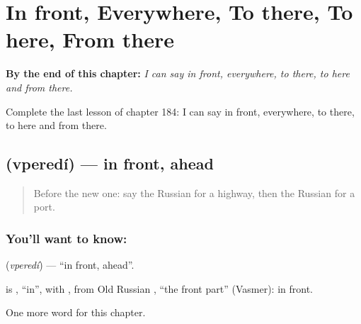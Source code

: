
\chapter{In front, Everywhere, To there, To here, From there}
\label{ch:ru-in-front-everywhere-to-there-to-here-from-there}

\begin{chapteropening}
\textbf{By the end of this chapter:} \emph{I can say in front, everywhere, to there, to here and from there.}

Complete the last lesson of chapter 184: I can say in front, everywhere, to there, to here and from there.
\end{chapteropening}

\section[\texorpdfstring{\ru{впереди} (vperedí)}{впереди (vperedí)}]{ (vperedí) — in front, ahead}

\label{lesson:RU-C184-vperedi}



\begin{quote}
Before the new one: say the Russian for a highway, then the Russian for a port.
\end{quote}

\subsection*{You'll want to know: }
\textbf{} (\emph{vperedí}) — \textquotedblleft{}in front, ahead\textquotedblright{}.

\begin{cousinweb}
\textbf{} is \emph{}, \textquotedblleft{}in\textquotedblright{}, with \emph{}, from Old Russian \emph{}, \textquotedblleft{}the front part\textquotedblright{} (Vasmer): in front.
\end{cousinweb}

\begin{grammarlens}[title={What you've built}]
One more word for this chapter.
\end{grammarlens}

